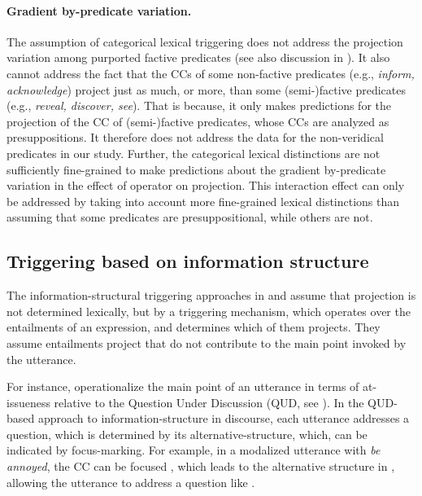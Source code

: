 \documentclass[a4paper,12pt,twoside]{article}
\begin{document}
		\paragraph{Gradient by-predicate variation.} The assumption of categorical lexical triggering does not address the projection variation among purported factive predicates (see also discussion in \citealt{degen_are_2022}). It also cannot address the fact that the CCs of some non-factive predicates (e.g., \emph{inform, acknowledge}) project just as much, or more, than some (semi-)factive predicates (e.g., \emph{reveal, discover, see}). That is because, it only makes predictions for the projection of the CC of (semi-)factive predicates, whose CCs are analyzed as presuppositions. It therefore does not address the data for the non-veridical predicates in our study.
		Further, the categorical lexical distinctions are not sufficiently fine-grained to make predictions about the gradient by-predicate variation in the effect of operator on projection.
		This interaction effect can only be addressed by taking into account more fine-grained lexical distinctions than assuming that some predicates are presuppositional, while others are not.


	\subsection{Triggering based on information structure} %
		The information-structural triggering approaches in \citealt{abrusan_predicting_2011} and \citealt{simons_best_2017} assume that projection is not determined lexically, but by a triggering mechanism, which operates over the entailments of an expression, and determines which of them projects. They assume entailments project that do not contribute to the main point invoked by the utterance.


		For instance, \citet{simons_best_2017} operationalize the main point of an utterance in terms of at-issueness relative to the Question Under Discussion (QUD, see \citealt{roberts_information_1996,roberts_information_2012}). 
		In the QUD-based approach to information-structure in discourse, each utterance addresses a question, which is determined by its alternative-structure, which, can be indicated by focus-marking. For example, in a modalized utterance with \emph{be annoyed}, the CC can be focused \Next[b], which leads to the alternative structure in \Next[c], allowing the utterance to address a question like \Next[a].
\end{document}
